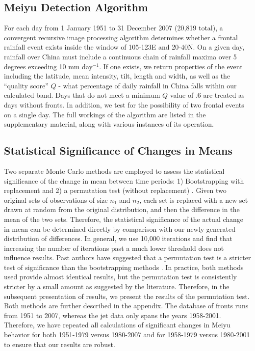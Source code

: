 \documentclass[draft,grl]{AGUTeX}
\begin{document}
\begin{article}
\subsection{Meiyu Detection Algorithm}

	For each day from 1 January 1951 to 31 December 2007 (20,819 total), a convergent recursive image processing algorithm determines whether a frontal rainfall event exists inside the window of 105-123E and 20-40N. On a given day, rainfall over China must include a continuous chain of rainfall maxima over 5 degrees exceeding 10 mm day$^{-1}$. If one exists, we return properties of the event including the latitude, mean intensity, tilt, length and width, as well as the ``quality score'' $Q$ - what percentage of daily rainfall in China falls within our calculated band. Days that do not meet a minimum $Q$ value of .6 are treated as days without fronts. In addition, we test for the possibility of two frontal events on a single day. The full workings of the algorithm are listed in the supplementary material, along with various instances of its operation.

\subsection{Statistical Significance of Changes in Means}

	Two separate Monte Carlo methods are employed to assess the statistical significance of the change in mean between time periods: 1) Bootstrapping with replacement and 2) a permutation test (without replacement) \citep{Good2005}. Given two original sets of observations of size $n_1$ and $n_2$, each set is replaced with a new set drawn at random from the original distribution, and then the difference in the mean of the two sets. Therefore, the statistical significance of the actual change in mean can be determined directly by comparison with our newly generated distribution of differences. In general, we use 10,000 iterations and find that increasing the number of iterations past a much lower threshold does not influence results. Past authors have suggested that a permutation test is a stricter test of significance than the bootstrapping methods \citep{Hesterberg2003}. In practice, both methods used provide almost identical results, but the permutation test is consistently stricter by a small amount as suggested by the literature. Therefore, in the subsequent presentation of results, we present the results of the permutation test. Both methods are further described in the appendix. The database of fronts runs from 1951 to 2007, whereas the jet data only spans the years 1958-2001. Therefore, we have repeated all calculations of significant changes in Meiyu behavior for both 1951-1979 versus 1980-2007 and for 1958-1979 versus 1980-2001 to ensure that our results are robust.


\end{article}
\end{document}
